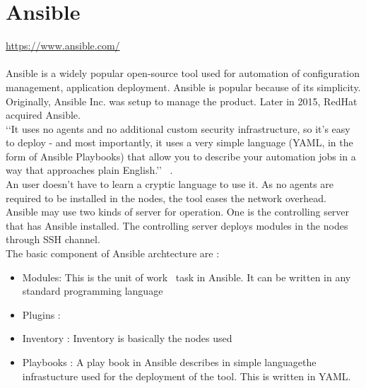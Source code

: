 \section{Ansible}
\url{ https://www.ansible.com/ } \\
\\
Ansible is a widely popular open-source tool used for automation of configuration management,
application deployment. Ansible is popular because of its simplicity. Originally, Ansible Inc.
was setup to manage the product. Later in 2015, RedHat acquired Ansible.\\
‘‘It uses no agents and no additional custom security infrastructure, so it’s easy to deploy - 
and most importantly, it uses a very simple language (YAML, in the form of Ansible Playbooks) 
that allow you to describe your automation jobs in a way that approaches plain English.’’
~\cite {hid-sp18-417-doc-Ansible}. \\
An user doesn’t have to learn a cryptic language to use it. 
As no agents are required to be installed in the nodes, the tool eases the network overhead. \\
Ansible may use two kinds of server for operation. One is the controlling server that has Ansible installed.
The controlling server deploys modules in the nodes through SSH channel. \\
The basic component of Ansible archtecture are : \\
\begin{itemize}
\item        Modules: This is the unit of work \ task in Ansible. It can be written in any standard programming language
\item        Plugins :
\item        Inventory : Inventory is basically the nodes used
\item        Playbooks : A play book in Ansible describes in simple languagethe 
infrastucture used for the deployment of the tool. This is written in YAML.
\end{itemize}


